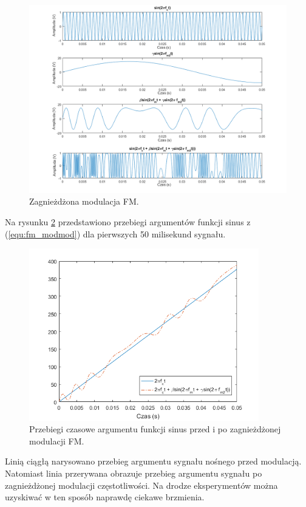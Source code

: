 \begin{figure}[H]
	\centering
	\includegraphics[width=14cm]{grafiki/fm_modmod}
	\captionsetup{justification=centering}
	\caption{Zagnieżdżona modulacja FM.}
	\label{rys:fm_modmod}
\end{figure}
Na rysunku \ref{rys:fm_arg2} przedstawiono przebiegi argumentów funkcji sinus z (\ref{equ:fm_modmod}) dla pierwszych 50 milisekund sygnału.
\begin{figure}[H]
	\centering
	\includegraphics[width=10cm]{grafiki/fm_arg2}
	\captionsetup{justification=centering}
	\caption{Przebiegi czasowe argumentu funkcji sinus przed i po zagnieżdżonej modulacji FM.}
	\label{rys:fm_arg2}
\end{figure}
Linią ciągłą narysowano przebieg argumentu sygnału nośnego przed modulacją. Natomiast linia przerywana obrazuje przebieg argumentu sygnału po zagnieżdżonej modulacji częstotliwości. Na drodze eksperymentów można uzyskiwać w ten sposób naprawdę ciekawe brzmienia.

